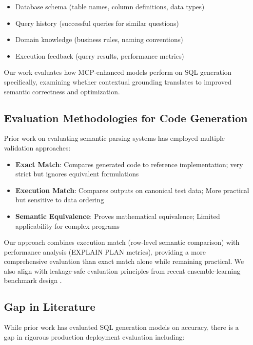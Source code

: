 \begin{itemize}
    \item Database schema (table names, column definitions, data types)
    \item Query history (successful queries for similar questions)
    \item Domain knowledge (business rules, naming conventions)
    \item Execution feedback (query results, performance metrics)
\end{itemize}

Our work evaluates how MCP-enhanced models perform on SQL generation specifically, examining whether contextual grounding translates to improved semantic correctness and optimization.

\subsection{Evaluation Methodologies for Code Generation}

Prior work on evaluating semantic parsing systems has employed multiple validation approaches:

\begin{itemize}
    \item \textbf{Exact Match}: Compares generated code to reference implementation; very strict but ignores equivalent formulations
    \item \textbf{Execution Match}: Compares outputs on canonical test data; More practical but sensitive to data ordering
    \item \textbf{Semantic Equivalence}: Proves mathematical equivalence; Limited applicability for complex programs
\end{itemize}

Our approach combines execution match (row-level semantic comparison) with performance analysis (EXPLAIN PLAN metrics), providing a more comprehensive evaluation than exact match alone while remaining practical. We also align with leakage-safe evaluation principles from recent ensemble-learning benchmark design \cite{mishra2026erp}.

\subsection{Gap in Literature}

While prior work has evaluated SQL generation models on accuracy, there is a gap in rigorous production deployment evaluation including:

